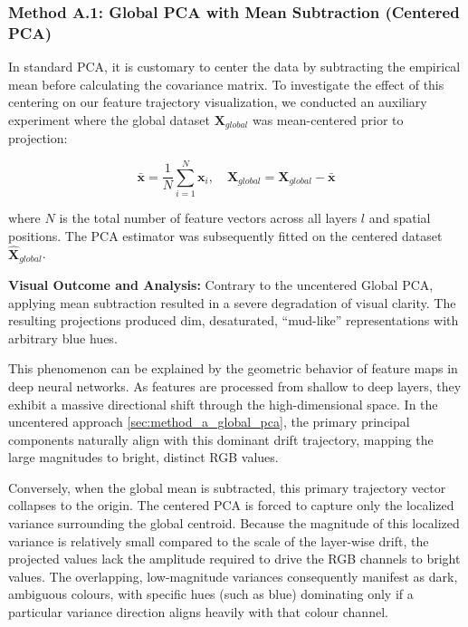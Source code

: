 \documentclass[oneside]{ctuthesis}
\begin{document}
\subsubsection{Method A.1: Global PCA with Mean Subtraction (Centered PCA)}

In standard PCA, it is customary to center the data by subtracting the empirical mean before calculating the covariance matrix. To investigate the effect of this centering on our feature trajectory visualization, we conducted an auxiliary experiment where the global dataset $\mathbf{X}_{global}$ was mean-centered prior to projection:

\begin{equation}
    \bar{\mathbf{x}} = \frac{1}{N} \sum_{i=1}^{N} \mathbf{x}_{i}, \quad \hat{\mathbf{X}}_{global} = \mathbf{X}_{global} - \bar{\mathbf{x}}
\end{equation}

where $N$ is the total number of feature vectors across all layers $l$ and spatial positions. The PCA estimator was subsequently fitted on the centered dataset $\hat{\mathbf{X}}_{global}$.

\textbf{Visual Outcome and Analysis:} Contrary to the uncentered Global PCA, applying mean subtraction resulted in a severe degradation of visual clarity. The resulting projections produced dim, desaturated, ``mud-like'' representations with arbitrary blue hues.

This phenomenon can be explained by the geometric behavior of feature maps in deep neural networks. As features are processed from shallow to deep layers, they exhibit a massive directional shift through the high-dimensional space. In the uncentered approach \ref{sec:method_a_global_pca}, the primary principal components naturally align with this dominant drift trajectory, mapping the large magnitudes to bright, distinct RGB values. 

Conversely, when the global mean is subtracted, this primary trajectory vector collapses to the origin. The centered PCA is forced to capture only the localized variance surrounding the global centroid. Because the magnitude of this localized variance is relatively small compared to the scale of the layer-wise drift, the projected values lack the amplitude required to drive the RGB channels to bright values. The overlapping, low-magnitude variances consequently manifest as dark, ambiguous colours, with specific hues (such as blue) dominating only if a particular variance direction aligns heavily with that colour channel.
\end{document}
